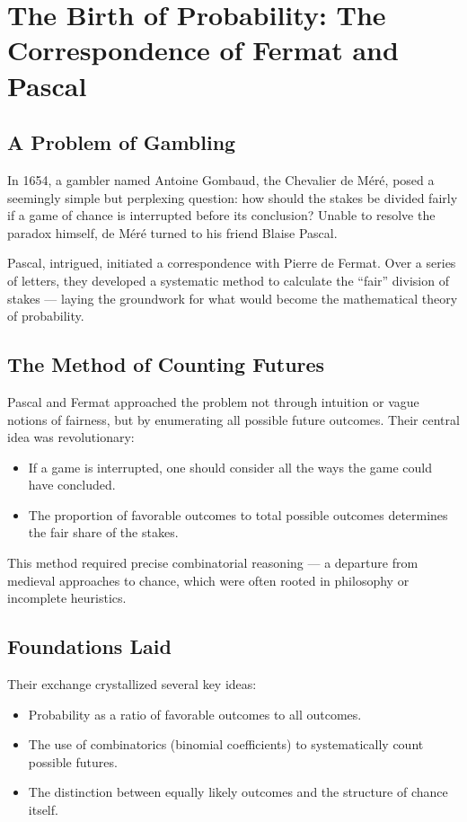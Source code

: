 \section{The Birth of Probability: The Correspondence of Fermat and Pascal}

\subsection{A Problem of Gambling}

In 1654, a gambler named Antoine Gombaud, the Chevalier de Méré, posed a seemingly simple but perplexing question: how should the stakes be divided fairly if a game of chance is interrupted before its conclusion? Unable to resolve the paradox himself, de Méré turned to his friend Blaise Pascal.

Pascal, intrigued, initiated a correspondence with Pierre de Fermat. Over a series of letters, they developed a systematic method to calculate the ``fair'' division of stakes — laying the groundwork for what would become the mathematical theory of probability.

\subsection{The Method of Counting Futures}

Pascal and Fermat approached the problem not through intuition or vague notions of fairness, but by enumerating all possible future outcomes. Their central idea was revolutionary:

\begin{itemize}
    \item If a game is interrupted, one should consider all the ways the game could have concluded.
    \item The proportion of favorable outcomes to total possible outcomes determines the fair share of the stakes.
\end{itemize}

This method required precise combinatorial reasoning — a departure from medieval approaches to chance, which were often rooted in philosophy or incomplete heuristics.

\subsection{Foundations Laid}

Their exchange crystallized several key ideas:
\begin{itemize}
    \item Probability as a ratio of favorable outcomes to all outcomes.
    \item The use of combinatorics (binomial coefficients) to systematically count possible futures.
    \item The distinction between equally likely outcomes and the structure of chance itself.
\end{itemize}

